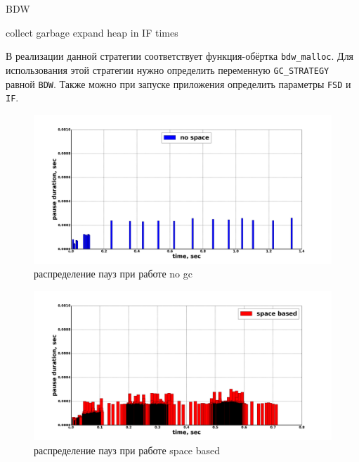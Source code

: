 \begin{algorithm}[hbt]
\caption{BDW}
\label{BDW-algo1}
\begin{algorithmic}[1]
        \State collect garbage
    \Else 
        \State expand heap in IF times
    \EndIf
\EndIf
\end{algorithmic}
\end{algorithm}

В реализации данной стратегии соответствует функция-обёртка \texttt{bdw\_malloc}. Для использования
этой стратегии нужно определить переменную \texttt{GC\_STRATEGY} равной \texttt{BDW}. Также можно при запуске приложения
определить параметры \texttt{FSD} и \texttt{IF}.

\begin{figure}[ph]
\caption{\label{pic:pause-no-gc}распределение пауз при работе no gc}
\includegraphics[width=1\linewidth]{Bakradze/no-apce.png}
\end{figure}

\begin{figure}[ph]
\caption{\label{pic:space-based-pause}распределение пауз при работе space based}
\includegraphics[width=1\linewidth]{Bakradze/space-based-pause-same.png}
\end{figure}

